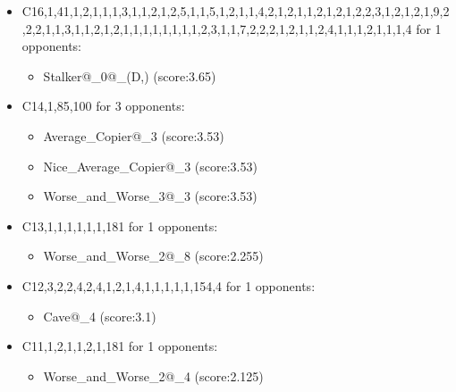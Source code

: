 \begin{appendices}
\begin{itemize}
        \item C16,1,41,1,2,1,1,1,3,1,1,2,1,2,5,1,1,5,1,2,1,1,4,2,1,2,1,1,2,1,2,1,2,2,3,1,2,1,2,1,9,2,2,2,1,1,3,1,1,2,1,2,1,1,1,1,1,1,1,1,2,3,1,1,7,2,2,2,1,2,1,1,2,4,1,1,1,2,1,1,1,4 for 1 opponents:
        \begin{multicols}{3}
            \begin{itemize}
                \item Stalker@\_0@\_(D,) (score:3.65)
            \end{itemize}
        \end{multicols}

        \item C14,1,85,100 for 3 opponents:
        \begin{multicols}{3}
            \begin{itemize}
                \item Average\_Copier@\_3 (score:3.53)
                \item Nice\_Average\_Copier@\_3 (score:3.53)
                \item Worse\_and\_Worse\_3@\_3 (score:3.53)
            \end{itemize}
        \end{multicols}

        \item C13,1,1,1,1,1,1,181 for 1 opponents:
        \begin{multicols}{3}
            \begin{itemize}
                \item Worse\_and\_Worse\_2@\_8 (score:2.255)
            \end{itemize}
        \end{multicols}

        \item C12,3,2,2,4,2,4,1,2,1,4,1,1,1,1,1,154,4 for 1 opponents:
        \begin{multicols}{3}
            \begin{itemize}
                \item Cave@\_4 (score:3.1)
            \end{itemize}
        \end{multicols}

        \item C11,1,2,1,1,2,1,181 for 1 opponents:
        \begin{multicols}{3}
            \begin{itemize}
                \item Worse\_and\_Worse\_2@\_4 (score:2.125)
            \end{itemize}
        \end{multicols}


\end{itemize}
\end{appendices}

